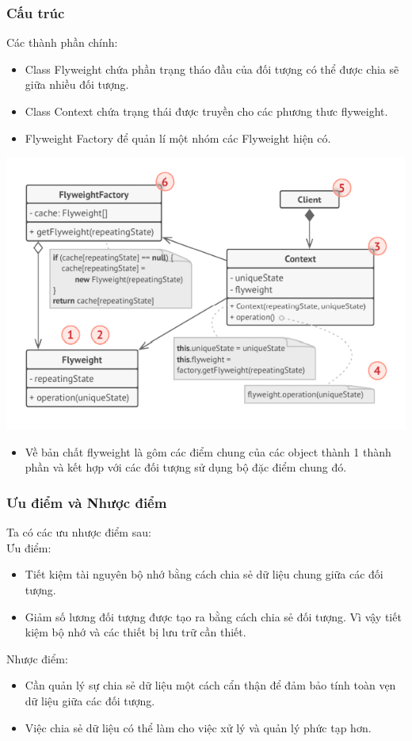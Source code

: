 \subsubsection{Cấu trúc}
Các thành phần chính:
\begin{itemize}
    \item Class Flyweight chứa phần trạng tháo đầu của đối tượng có thể được chia sẽ giữa nhiều đối tượng. 
    \item Class Context chứa trạng thái được truyền cho các phương thưc flyweight.
    \item Flyweight Factory để quản lí một nhóm các Flyweight hiện có.
\end{itemize}
\begin{center}
    \includegraphics[scale=0.6]{image/structural/flyweight.png}
\end{center}
\begin{itemize}
    \item Về bản chất flyweight là gôm các điểm chung của các object thành 1 thành phần và kết hợp với các đối tượng sử dụng bộ đặc điểm chung đó.
\end{itemize}
\subsubsection{Ưu điểm và Nhược điểm}
Ta có các ưu nhược điểm sau:\\
Ưu điểm:
\begin{itemize}
    \item Tiết kiệm tài nguyên bộ nhớ bằng cách chia sẻ dữ liệu chung giữa các đối tượng.
    \item Giảm số lương đối tượng được tạo ra bằng cách chia sẻ đối tượng. Vì vậy tiết kiệm bộ nhớ và các thiết bị lưu trữ cần thiết.
\end{itemize}
Nhược điểm:
\begin{itemize}
    \item Cần quản lý sự chia sẻ dữ liệu một cách cẩn thận để đảm bảo tính toàn vẹn dữ liệu giữa các đối tượng.
    \item Việc chia sẻ dữ liệu có thể làm cho việc xử lý và quản lý phức tạp hơn.
\end{itemize}
